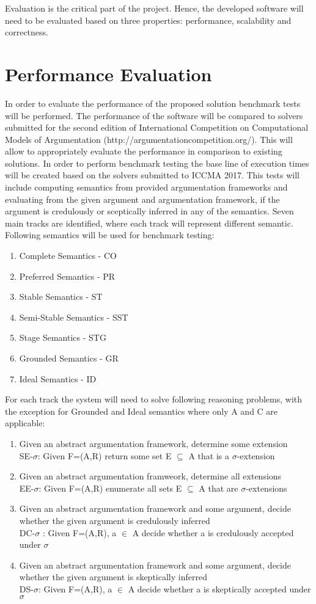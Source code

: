 Evaluation is the critical part of the project. Hence, the developed software will need to be evaluated based on three properties: performance, scalability and correctness. 

\section{Performance Evaluation}
In order to evaluate the performance of the proposed solution benchmark tests will be performed. The performance of the software will be compared to solvers submitted for the second edition of International Competition on Computational Models of Argumentation (http://argumentationcompetition.org/). This will allow to appropriately evaluate the performance in comparison to existing solutions. In order to perform benchmark testing the base line of execution times will be created based on the solvers submitted to ICCMA 2017. This tests will include computing semantics from provided argumentation frameworks and evaluating from the given argument and argumentation framework, if the argument is credulously or sceptically inferred in any of the semantics. Seven main tracks are identified, where each track will represent different semantic. Following semantics will be used for benchmark testing:
\begin{enumerate}
	\item{Complete Semantics - CO}
	\item{Preferred Semantics - PR}
	\item{Stable Semantics - ST}
	\item{Semi-Stable Semantics - SST}
	\item{Stage Semantics - STG}
	\item{Grounded Semantics - GR}
	\item{Ideal Semantics - ID}
\end{enumerate}

For each track the system will need to solve following reasoning problems, with the exception for Grounded and Ideal semantics where only A and C are applicable:
\begin{enumerate}
	\item{Given an abstract argumentation framework, determine some extension\\SE-$\sigma$: Given F=(A,R) return some set E $\subseteq$ A that is a $\sigma$-extension}
	\item{Given an abstract argumentation framweork, determine all extensions\\EE-$\sigma$: Given F=(A,R) enumerate all sets E $\subseteq$ A that are $\sigma$-extensions}
	\item{Given an abstract argumentation framework and some argument, decide whether the given argument is credulously inferred\\DC-$\sigma$ : Given F=(A,R), a $\in$ A decide whether a is credulously accepted under $\sigma$}
	\item{Given an abstract argumentation framework and some argument, decide whether the given argument is skeptically inferred\\DS-$\sigma$: Given F=(A,R), a $\in$ A decide whether a is skeptically accepted under $\sigma$}
\end{enumerate}


